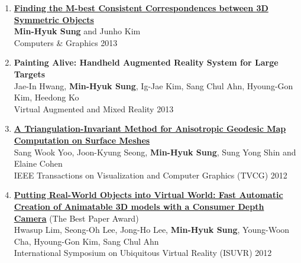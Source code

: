 \documentclass[letterpaper,10pt]{article} %
\newcommand{\blankline}{\quad\pagebreak[2]}
\begin{document}
\begin{enumerate}
\item \label{cg13}
\href{http://dx.doi.org/10.1016/j.cag.2012.11.002}{\textbf{Finding the M-best Consistent Correspondences between 3D Symmetric Objects}} \\
\textbf{Min-Hyuk Sung} and Junho Kim\\
Computers \& Graphics 2013\\
\blankline

\item \label{vamr13}
\textbf{Painting Alive: Handheld Augmented Reality System for Large Targets} \\
Jae-In Hwang, \textbf{Min-Hyuk Sung}, Ig-Jae Kim, Sang Chul Ahn, Hyoung-Gon Kim, Heedong Ko\\
Virtual Augmented and Mixed Reality 2013\\
\blankline

\item \label{tvcg12}
\href{http://dx.doi.org/10.1109/TVCG.2012.29}{\textbf{A Triangulation-Invariant Method for Anisotropic Geodesic Map Computation on Surface Meshes}} \\
Sang Wook Yoo, Joon-Kyung Seong, \textbf{Min-Hyuk Sung}, Sung Yong Shin and Elaine Cohen\\
IEEE Transactions on Visualization and Computer Graphics (TVCG) 2012\\
\blankline

\item \label{isuvr12}
\href{http://dx.doi.org/10.1109/ISUVR.2012.12}{\textbf{Putting Real-World Objects into Virtual World: Fast Automatic Creation of Animatable 3D models with a Consumer Depth Camera}} (The Best Paper Award)\\
Hwasup Lim, Seong-Oh Lee, Jong-Ho Lee, \textbf{Min-Hyuk Sung}, Young-Woon Cha, Hyoung-Gon Kim, Sang Chul Ahn \\
International Symposium on Ubiquitous Virtual Reality (ISUVR) 2012\\
\blankline


\end{enumerate}
\end{document}
